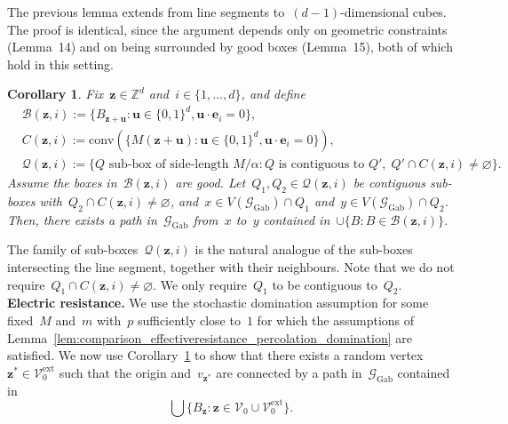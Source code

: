 \documentclass[a4paper,11pt]{article}
\newcommand{\ZZ}{\mathbb{Z}}
\newtheorem{corollary}{Corollary}
\theoremstyle{definition}
\begin{document}
The previous lemma extends from line segments to~$(d-1)$-dimensional cubes. The proof is identical, since the argument depends only on geometric constraints (Lemma~14) and on being surrounded by good boxes (Lemma~15), both of which hold in this setting.

\begin{corollary}\label{cor_Gab_conn}
Fix~$\mathbf z \in \ZZ^d$ and~$i \in \{1,\dots,d\}$, and define
\begin{align*}
& \mathcal B(\mathbf z, i) := \{ B_{\mathbf z + \mathbf u}: \mathbf u \in \{0,1\}^d, \mathbf u \cdot \mathbf{e}_i = 0\}, \\[2mm]
& C(\mathbf z,i) := \mathrm{conv}( \{M(\mathbf z + \mathbf u): \mathbf u \in \{0,1\}^d, \mathbf u \cdot \mathbf e_i = 0 \} ), \\[2mm]
& \mathcal Q(\mathbf z,i) := \{ Q \text{ sub-box of side-length } M/\alpha: Q \text{ is contiguous to } Q', \; Q' \cap C(\mathbf z,i) \neq \varnothing  \}.
\end{align*}
Assume the boxes in~$\mathcal B(\mathbf z, i)$ are good. Let~$Q_1,Q_2 \in \mathcal Q(\mathbf z,i)$ be contiguous sub-boxes with~$Q_2 \cap C(\mathbf z,i) \neq \varnothing$, and~$x \in V(\mathcal G_\mathrm{Gab}) \cap Q_1$ and~$y \in V(\mathcal G_\mathrm{Gab}) \cap Q_2$. Then, there exists a path in~$\mathcal G_\mathrm{Gab}$ from~$x$ to~$y$ contained in~$\cup \{B: B \in \mathcal B(\mathbf z, i) \}$.    
\end{corollary}
The family of sub-boxes~$\mathcal Q(\mathbf z,i)$ is the natural analogue of the sub-boxes intersecting the line segment, together with their neighbours. Note that we do not require~$Q_1 \cap C(\mathbf z,i) \neq \varnothing$. We only require~$Q_1$ to be contiguous to~$Q_2$.  \\


\noindent \textbf{Electric resistance.} We use the stochastic domination assumption for some fixed~$M$ and~$m$ with~$p$ sufficiently close to~$1$ for which the assumptions of Lemma~\ref{lem:comparison_effectiveresistance_percolation_domination} are satisfied. We now use Corollary~\ref{cor_Gab_conn} to show that there exists a random vertex~$\mathbf z^\ast \in \mathcal V^\mathrm{ext}_0$ such that the origin and~$v_{\mathbf z^\ast}$ are connected by a path in~$\mathcal G_\mathrm{Gab}$ contained in 
$$ \bigcup \{ B_\mathbf{z}: \mathbf z \in \mathcal V_0 \cup \mathcal{V}^\mathrm{ext}_0 \}.$$
\end{document}
